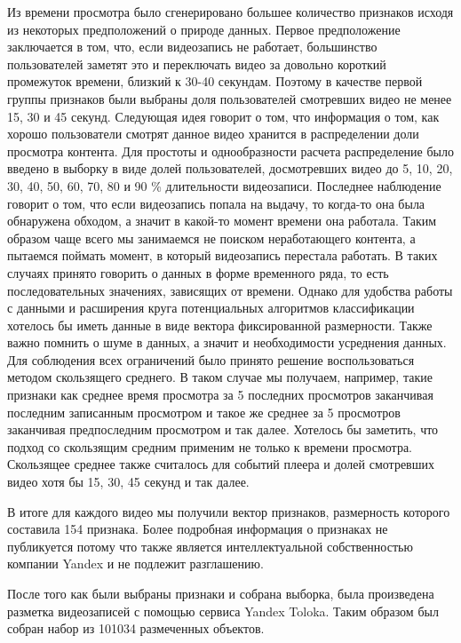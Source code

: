 Из времени просмотра было сгенерировано большее количество признаков исходя из некоторых предположений о природе данных. Первое предположение заключается в том, что, если видеозапись не работает, большинство пользователей заметят это и переключать видео за довольно короткий промежуток времени, близкий к 30-40 секундам. Поэтому в качестве первой группы признаков были выбраны доля пользователей смотревших видео не менее 15, 30 и 45 секунд. Следующая идея говорит о том, что информация о том, как хорошо пользователи смотрят данное видео хранится в распределении доли просмотра контента. Для простоты и однообразности расчета распределение было введено в выборку в виде долей пользователей, досмотревших видео до 5, 10, 20, 30, 40, 50, 60, 70, 80 и 90 \% длительности видеозаписи. Последнее наблюдение говорит о том, что если видеозапись попала на выдачу, то когда-то она была обнаружена обходом, а значит в какой-то момент времени она работала. Таким образом чаще всего мы занимаемся не поиском неработающего контента, а пытаемся поймать момент, в который видеозапись перестала работать. В таких случаях принято говорить о данных в форме временного ряда, то есть последовательных значениях, зависящих от времени. Однако для удобства работы с данными и расширения круга потенциальных алгоритмов классификации хотелось бы иметь данные в виде вектора фиксированной размерности. Также важно помнить о шуме в данных, а значит и необходимости усреднения данных. Для соблюдения всех ограничений было принято решение воспользоваться методом скользящего среднего. В таком случае мы получаем, например, такие признаки как среднее время просмотра за 5 последних просмотров заканчивая последним записанным просмотром и такое же среднее за 5 просмотров заканчивая предпоследним просмотром и так далее. Хотелось бы заметить, что подход со скользящим средним применим не только к времени просмотра. Скользящее среднее также считалось для событий плеера и долей смотревших видео хотя бы 15, 30, 45 секунд и так далее.

В итоге для каждого видео мы получили вектор признаков, размерность которого составила 154 признака. Более подробная информация о признаках не публикуется потому что также является интеллектуальной собственностью компании Yandex и не подлежит разглашению.

После того как были выбраны признаки и собрана выборка, была произведена разметка видеозаписей с помощью сервиса Yandex Toloka. Таким образом был собран набор из 101034 размеченных объектов.